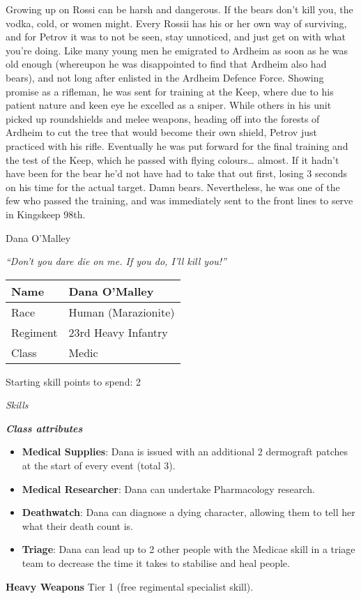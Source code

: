 \documentclass{scrbook}
\begin{document}
Growing up on Rossi can be harsh and dangerous. If the bears don't kill you, the vodka, cold, or women might. Every Rossii has his or her own way of surviving, and for Petrov it was to not be seen, stay unnoticed, and just get on with what you're doing. Like many young men he emigrated to Ardheim as soon as he was old enough (whereupon he was disappointed to find that Ardheim also had bears), and not long after enlisted in the Ardheim Defence Force. Showing promise as a rifleman, he was sent for training at the Keep, where due to his patient nature and keen eye he excelled as a sniper. While others in his unit picked up roundshields and melee weapons, heading off into the forests of Ardheim to cut the tree that would become their own shield, Petrov just practiced with his rifle. Eventually he was put forward for the final training and the test of the Keep, which he passed with flying colours{\dots} almost. If it hadn't have been for the bear he'd not have had to take that out first, losing 3 seconds on his time for the actual target. Damn bears. Nevertheless, he was one of the few who passed the training, and was immediately sent to the front lines to serve in Kingskeep 98th.

Dana O'Malley

\textit{``Don't you dare die on me. If you do, I'll kill you!''}

\begin{table}
\begin{tabular}{|l|l|} \hline 
Name & Dana O'Malley \\
 \hline Race & Human (Marazionite) \\
 \hline Regiment & 23rd Heavy Infantry \\
 \hline Class & Medic \\
 \hline \end{tabular}

\end{table}

Starting skill points to spend: 2

\textit{Skills}

\textbf{\textit{Class attributes}}

\begin{itemize}
\item \textbf{Medical Supplies}: Dana is issued with an additional 2 dermograft patches at the start of every event (total 3).

\item \textbf{Medical Researcher}: Dana can undertake Pharmacology research.

\item \textbf{Deathwatch}: Dana can diagnose a dying character, allowing them to tell her what their death count is.

\item \textbf{Triage}: Dana can lead up to 2 other people with the Medicae skill in a triage team to decrease the time it takes to stabilise and heal people.

\end{itemize}
\textbf{Heavy Weapons} Tier 1 (free regimental specialist skill).
\end{document}
